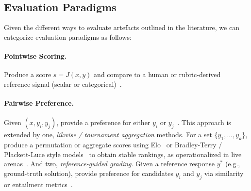 \subsection{Evaluation Paradigms}
Given the different ways to evaluate artefacts outlined in the literature, we can categorize evaluation paradigms as follows:
\paragraph{Pointwise Scoring.} Produce a score $s = J(x,y)$ and compare to a human or rubric-derived reference signal (scalar or categorical)~\cite{fu2023gptscore, li2024_llmsasjudges}. 
\paragraph{Pairwise Preference.} Given $(x, y_i, y_j)$, provide a preference for either $y_i$ or $y_j$~\cite{zheng2023judgelm}. This approach is extended by one, \emph{likwise / tournament aggregation} methods. For a set $\{y_1,\dots,y_k\}$, produce a permutation or aggregate scores using Elo~\cite{elo1978rating, zheng2023judgelm} or Bradley-Terry / Plackett-Luce style models~\cite{bradley1952rank} to obtain stable rankings, as operationalized in live arenas~\cite{zheng2023judgelm}. And two, \emph{reference-guided grading}. Given a reference response $y^{*}$ (e.g., ground-truth solution), provide preference for candidates $y_i$ and $y_j$ via similarity or entailment metrics~\cite{zheng2023judgelm}.

